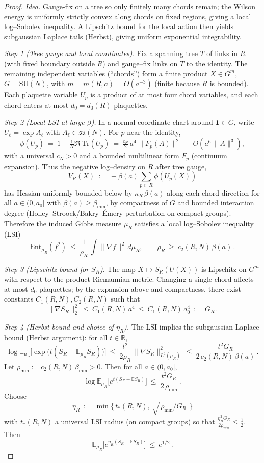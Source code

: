 \documentclass[11pt]{amsart}
\begin{document}
\begin{proof}
\emph{Idea.} Gauge-fix on a tree so only finitely many chords remain; the Wilson energy is uniformly strictly convex along chords on fixed regions, giving a local log–Sobolev inequality. A Lipschitz bound for the local action then yields subgaussian Laplace tails (Herbst), giving uniform exponential integrability.

\medskip
\emph{Step 1 (Tree gauge and local coordinates).} Fix a spanning tree $T$ of links in $R$ (with fixed boundary outside $R$) and gauge--fix links on $T$ to the identity. The remaining independent variables (``chords'') form a finite product $X\in G^{m}$, $G=\mathrm{SU}(N)$, with $m=m(R,a)=O(a^{-3})$ (finite because $R$ is bounded). Each plaquette variable $U_p$ is a product of at most four chord variables, and each chord enters at most $d_0=d_0(R)$ plaquettes.

\emph{Step 2 (Local LSI at large $\beta$).} In a normal coordinate chart around $\mathbf{1}\in G$, write $U_\ell=\exp A_\ell$ with $A_\ell\in\mathfrak{su}(N)$. For $p$ near the identity,
\[
  \phi(U_p)\ =\ 1-\tfrac{1}{N}\Re\,\mathrm{Tr}(U_p)
  \ =\ \tfrac{c_N}{2}\,a^4\,\|F_p(A)\|^2\ +\ O(a^6\,\|A\|^3),
\]
with a universal $c_N>0$ and a bounded multilinear form $F_p$ (continuum expansion). Thus the negative log--density on $R$ after tree gauge,
\[
  V_R(X)\ :=\ -\beta(a)\sum_{p\subset R}\phi(U_p(X))
\]
has Hessian uniformly bounded below by $\kappa_R\,\beta(a)$ along each chord direction for all $a\in(0,a_0]$ with $\beta(a)\ge \beta_{\min}$, by compactness of $G$ and bounded interaction degree (Holley--Stroock/Bakry--\'Emery perturbation on compact groups). Therefore the induced Gibbs measure $\mu_R$ satisfies a local log--Sobolev inequality (LSI)
\[
  \mathrm{Ent}_{\mu_R}(f^2)\ \le\ \frac{1}{\rho_R}\,\int \|\nabla f\|^2\,d\mu_R,
  \qquad \rho_R\ \ge\ c_2(R,N)\,\beta(a)\,.
\]

\emph{Step 3 (Lipschitz bound for $S_R$).} The map $X\mapsto S_R(U(X))$ is Lipschitz on $G^{m}$ with respect to the product Riemannian metric. Changing a single chord affects at most $d_0$ plaquettes; by the expansion above and compactness, there exist constants $C_1(R,N),C_2(R,N)$ such that
\[
  \|\nabla S_R\|_2^2\ \le\ C_1(R,N)\,a^4\ \le\ C_1(R,N)\,a_0^4\ :=\ G_R\,.
\]

\emph{Step 4 (Herbst bound and choice of $\eta_R$).} The LSI implies the subgaussian Laplace bound (Herbst argument): for all $t\in\mathbb{R}$,
\[
  \log\mathbb{E}_{\mu_R}\big[\exp\big(t(S_R-\mathbb{E}_{\mu_R}S_R)\big)\big]
  \ \le\ \frac{t^2}{2\rho_R}\,\|\nabla S_R\|_{L^2(\mu_R)}^2
  \ \le\ \frac{t^2 G_R}{2\,c_2(R,N)\,\beta(a)}\,.
\]
Let $\rho_{\min}:=c_2(R,N)\,\beta_{\min}>0$. Then for all $a\in(0,a_0]$,
\[
  \log\mathbb{E}_{\mu_R}\big[e^{t(S_R-\mathbb{E}S_R)}\big]\ \le\ \frac{t^2 G_R}{2\,\rho_{\min}}\,.
\]
Choose
\[
  \eta_R\ :=\ \min\Big\{\,t_*(R,N),\ \sqrt{\,\rho_{\min}/G_R\,}\,\Big\}
\]
with $t_*(R,N)$ a universal LSI radius (on compact groups) so that $\frac{\eta_R^2 G_R}{2\rho_{\min}}\le \tfrac12$. Then
\[
  \mathbb{E}_{\mu_R}\big[e^{\eta_R(S_R-\mathbb{E}S_R)}\big]\ \le\ e^{1/2}\,.
\]


\end{proof}
\end{document}
